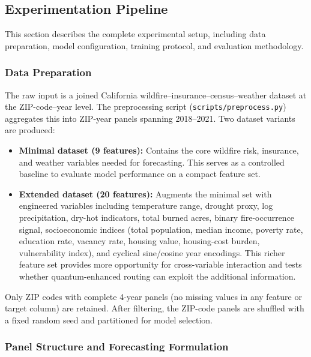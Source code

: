 \documentclass[11pt]{article}
\begin{document}
\subsection{Experimentation Pipeline}

This section describes the complete experimental setup, including data preparation, model configuration, training protocol, and evaluation methodology.

\subsubsection*{Data Preparation}

The raw input is a joined California wildfire--insurance--census--weather dataset at the ZIP-code--year level. The preprocessing script (\texttt{scripts/preprocess.py}) aggregates this into ZIP-year panels spanning 2018--2021. Two dataset variants are produced:

\begin{itemize}
  \item \textbf{Minimal dataset (9 features):} Contains the core wildfire risk, insurance, and weather variables needed for forecasting. This serves as a controlled baseline to evaluate model performance on a compact feature set.
  \item \textbf{Extended dataset (20 features):} Augments the minimal set with engineered variables including temperature range, drought proxy, log precipitation, dry-hot indicators, total burned acres, binary fire-occurrence signal, socioeconomic indices (total population, median income, poverty rate, education rate, vacancy rate, housing value, housing-cost burden, vulnerability index), and cyclical sine/cosine year encodings. This richer feature set provides more opportunity for cross-variable interaction and tests whether quantum-enhanced routing can exploit the additional information.
\end{itemize}

Only ZIP codes with complete 4-year panels (no missing values in any feature or target column) are retained. After filtering, the ZIP-code panels are shuffled with a fixed random seed and partitioned for model selection.

\subsubsection*{Panel Structure and Forecasting Formulation}
\end{document}
